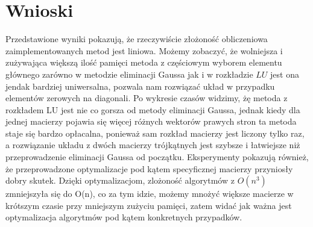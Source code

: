 \documentclass[12pt, a4paper]{article}
\begin{document}
\section{Wnioski}
Przedstawione wyniki pokazują, że rzeczywiście złożoność obliczeniowa zaimplementowanych metod jest liniowa. 
Możemy zobaczyć, że wolniejsza i zużywająca większą ilość pamięci metoda z częściowym wyborem elementu głównego zarówno w metodzie eliminacji Gaussa jak i w rozkładzie $LU$ jest ona jendak bardziej uniwersalna, pozwala nam rozwiązać układ w przypadku elementów zerowych na diagonali. Po wykresie czasów widzimy, żę metoda z rozkładem  LU jest nie co gorsza od metody eliminacji Gaussa, jednak kiedy dla jednej macierzy pojawia się więcej różnych wektorów prawych stron ta metoda staje się bardzo opłacalna, ponieważ sam rozkład macierzy jest liczony tylko raz, a rozwiązanie układu z dwóch macierzy trójkątnych jest szybsze i łatwiejsze niż przeprowadzenie eliminacji Gaussa od początku. Eksperymenty pokazują również, że przeprowadzone optymalizacje pod kątem specyficznej macierzy przyniosły dobry skutek. Dzięki optymalizacjom, zlożoność algorytmów z $O(n^3)$ zmniejszyła się do O(n), co za tym idzie, możemy mnożyć większe macierze w krótszym czasie przy mniejszym zużyciu pamięci, zatem widać jak ważna jest optymalizacja algorytmów pod kątem konkretnych przypadków. 
\end{document}
